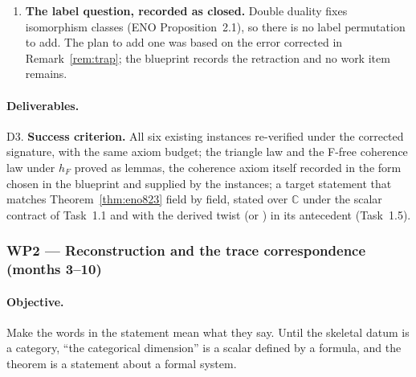 \documentclass[11pt,a4paper]{article}
\theoremstyle{remark}
\newcommand{\code}[1]{\texttt{\detokenize{#1}}}
\newcommand{\FPdim}{\mathrm{FPdim}}
\newcommand{\Vect}{\mathrm{Vec}}
\newcommand{\Cx}{\mathbb{C}}
\newcommand{\Z}{\mathbb{Z}}
\begin{document}
\begin{enumerate}[label=1.\arabic*]
\begin{enumerate}[label=(\alph*)]
quantifies over the \emph{carried} $J$, and as such it is \emph{false}: the pointed
$\Vect^{\omega}_{(\Z/2)^{2}}$ datum with $J \equiv 1$ is pseudo-unitary
($\sum_i \kappa_i\kappa_{i^*} = \sum_i f_i^{2} = 4$) and admits no pivotal structure with
$\dim = \FPdim$ --- with $J \equiv 1$, \code{p_mon} forces $p$ to be a character, and
$1/\kappa$ is not one. The exact target is therefore stated either in the corrected signature,
the carried $J$ field replaced by \code{derivedJ} (Task~2.3), or with the compatibility
hypothesis \code{J_match} in the antecedent, on the model of (a). Every statement of the
target in this proposal (Task~4.6, D6, M6, Appendix~\ref{app:statements}) carries this
qualification.
\end{enumerate}
\item \textbf{The label question, recorded as closed.} Double duality fixes isomorphism classes
(ENO Proposition~2.1), so there is no label permutation to add. The plan to add one was based on
the error corrected in Remark~\ref{rem:trap}; the blueprint records the retraction and no work
item remains.
\end{enumerate}
\paragraph{Deliverables.} D3. \quad \textbf{Success criterion.} All six existing instances
re-verified under the corrected signature, with the same axiom budget; the triangle law and
the F-free coherence law under $h_F$ proved as lemmas, the coherence axiom itself recorded in
the form chosen in the blueprint and supplied by the instances; a target statement that
matches Theorem~\ref{thm:eno823} field by field, stated over $\Cx$ under the scalar contract
of Task~1.1 and with the derived twist (or \code{J_match}) in its antecedent (Task~1.5).

\subsubsection*{WP2 --- Reconstruction and the trace correspondence (months 3--10)}

\paragraph{Objective.} Make the words in the statement mean what they say. Until the skeletal
datum is a category, ``the categorical dimension'' is a scalar defined by a formula, and the
theorem is a statement about a formal system.
\end{document}
